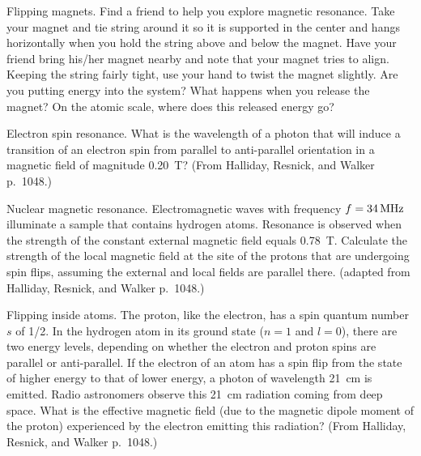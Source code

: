 \begin{aproblem}{Flipping magnets.} 
  Find a friend to help you explore magnetic resonance. Take your
  magnet and tie string around it so it is supported in the center and
  hangs horizontally when you hold the string above and below the
  magnet.  Have your friend bring his/her magnet nearby and note that
  your magnet tries to align.  Keeping the string fairly tight, use
  your hand to twist the magnet slightly. Are you putting energy into
  the system?  What happens when you release the magnet?  On the
  atomic scale, where does this released energy go?
\end{aproblem}


\begin{aproblem}{Electron spin resonance.}  
  What is the wavelength of a photon that will induce a transition of
  an electron spin from parallel to anti-parallel orientation in a
  magnetic field of magnitude 0.20\, T?  (From Halliday, Resnick, and
  Walker p.~1048.)
  \label{prob:spinflip}
\end{aproblem}

\newpage

\begin{aproblem}{Nuclear magnetic resonance.}
  Electromagnetic waves with frequency $f = 34\,\mbox{MHz}$ illuminate
  a sample that contains hydrogen atoms.  Resonance is observed when
  the strength of the constant external magnetic field equals 0.78\,
  T.  Calculate the strength of the local magnetic field at the site
  of the protons that are undergoing spin flips, assuming the external
  and local fields are parallel there.  (adapted from Halliday,
  Resnick, and Walker p.~1048.)
  \label{prob:nmr}
\end{aproblem}


\begin{aproblem}{Flipping inside atoms.}  
  The proton, like the electron, has a spin quantum number $s$ of 1/2.
  In the hydrogen atom in its ground state ($n = 1$ and $l = 0$),
  there are two energy levels, depending on whether the electron and
  proton spins are parallel or anti-parallel.  If the electron of an
  atom has a spin flip from the state of higher energy to that of
  lower energy, a photon of wavelength 21\, cm is emitted.  Radio
  astronomers observe this 21\, cm radiation coming from deep
  space. What is the effective magnetic field (due to the magnetic
  dipole moment of the proton) experienced by the electron emitting
  this radiation?  (From Halliday, Resnick, and Walker p.~1048.)
\end{aproblem}


